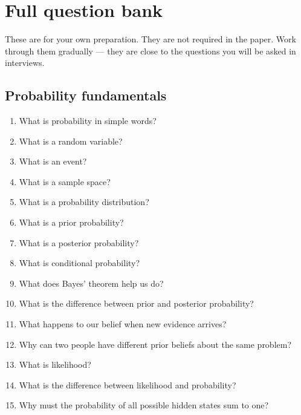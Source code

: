 \documentclass[11pt,a4paper]{article}
\begin{document}
\section{Full question bank}
\label{app:bank}

These are for your own preparation. They are not required in the paper. Work through them
gradually --- they are close to the questions you will be asked in interviews.

\subsection{Probability fundamentals}
\begin{enumerate}[itemsep=1pt]
\item What is probability in simple words?
\item What is a random variable?
\item What is an event?
\item What is a sample space?
\item What is a probability distribution?
\item What is a prior probability?
\item What is a posterior probability?
\item What is conditional probability?
\item What does Bayes' theorem help us do?
\item What is the difference between prior and posterior probability?
\item What happens to our belief when new evidence arrives?
\item Why can two people have different prior beliefs about the same problem?
\item What is likelihood?
\item What is the difference between likelihood and probability?
\item Why must the probability of all possible hidden states sum to one?
\end{enumerate}
\end{document}
